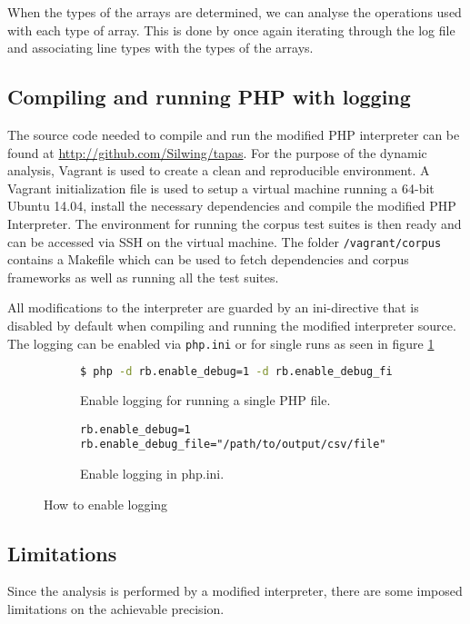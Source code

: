 When the types of the arrays are determined, we can analyse the operations used with each type of array. This is done by once again iterating through the log file and associating line types with the types of the arrays.

\subsection{Compiling and running PHP with logging}
The source code needed to compile and run the modified PHP interpreter can be found at \url{http://github.com/Silwing/tapas}. For the purpose of the dynamic analysis, Vagrant is used to create a clean and reproducible environment. A Vagrant initialization file is used to setup a virtual machine running a 64-bit Ubuntu 14.04, install the necessary dependencies and compile the modified PHP Interpreter. The environment for running the corpus test suites is then ready and can be accessed via SSH on the virtual machine. The folder \texttt{/vagrant/corpus} contains a Makefile which can be used to fetch dependencies and corpus frameworks as well as running all the test suites.

All modifications to the interpreter are guarded by an ini-directive that is disabled by default when compiling and running the modified interpreter source. The logging can be enabled via \texttt{php.ini} or for single runs as seen in figure \ref{fig:iniDirective}

\begin{figure}[ht]
\centering
\begin{subfigure}{\linewidth}
\begin{lstlisting}[language=bash]
$ php -d rb.enable_debug=1 -d rb.enable_debug_file=<path-to-log-file> <path-to-php-file>
\end{lstlisting}
\caption{Enable logging for running a single PHP file.}
\end{subfigure}
\begin{subfigure}{\linewidth}
\begin{lstlisting}
rb.enable_debug=1
rb.enable_debug_file="/path/to/output/csv/file"
\end{lstlisting}
\caption{Enable logging in php.ini.}
\end{subfigure}
\caption{How to enable logging}
\label{fig:iniDirective}
\end{figure}

\subsection{Limitations}
\label{sec:limitations}
Since the analysis is performed by a modified interpreter, there are some imposed limitations on the achievable precision. 

